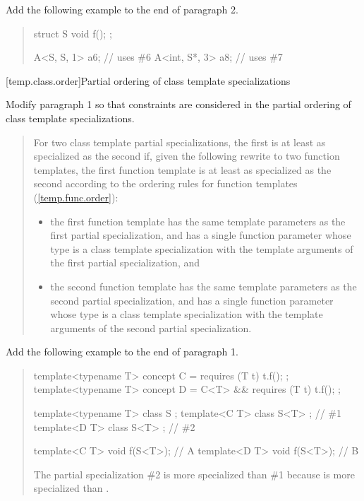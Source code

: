 Add the following example to the end of paragraph 2.

\begin{quote}
\begin{addedblock}
\enterexample
\begin{codeblock}
struct S { void f(); };

A<S, S, 1>    a6; // uses \#6
A<int, S*, 3> a8; // uses \#7
\end{codeblock}
\exitexample
\end{addedblock}
\end{quote}


[temp.class.order]{Partial ordering of class template specializations}

Modify paragraph 1 so that constraints are considered in the
partial ordering of class template specializations. 

\begin{quote}
\pnum
For two class template partial specializations, the first is 
at least as specialized as the second if, given the following 
rewrite to two function templates, the first function template 
is at least as specialized as the second according to the ordering 
rules for function templates 
(\ref{temp.func.order}):
% 
\begin{itemize}
\item the first function template has the same template 
parameters  
as the first partial specialization, and has a single function parameter 
whose type is a class template specialization with the template
arguments of the first partial specialization, and

\item the second function template has the same template 
parameters  
as the second partial specialization, and has a single function parameter 
whose type is a class template specialization with the template
arguments of the second partial specialization.
\end{itemize}
\end{quote}

Add the following example to the end of paragraph 1.

\begin{quote}
\begin{addedblock}
\enterexample
\begin{codeblock}
template<typename T> concept C = requires (T t) { t.f(); };
template<typename T> concept D = C<T> && requires (T t) { t.f(); };

template<typename T> class S { };
template<C T> class S<T> { }; // \#1
template<D T> class S<T> { }; // \#2

template<C T> void f(S<T>); // A
template<D T> void f(S<T>); // B
\end{codeblock}
The partial specialization \#2 is more specialized than 
\#1 because  is more specialized than .
\exitexample
\end{addedblock}
\end{quote}


